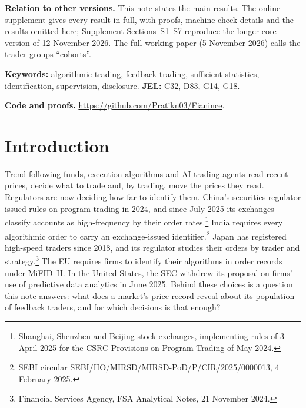 \begin{abstract}
\noindent Algorithmic traders read prices and, by trading, move them. Populations with the same feedback kernel produce identical prices, profits and equilibria; prices identify nothing finer, and learning composition costs data of order $(\Delta\eta)^{-(4K-2)}$, even near instability, so targeted supervision needs tagged flow. In a pre-registered out-of-sample test on Taiwan's tagged exchange flows (2019--2023), prices improve forecasts of foreign investors' flow as the registered criterion requires, but a pre-specified check attributes the gain to prices revealing past flow rather than to feedback. A registered test of the position-limit prediction on Binance perpetual futures is inconclusive. Core results are machine-checked in Lean~4.
\end{abstract}

\noindent\textbf{Relation to other versions.} This note states the main results. The online supplement gives every result in full, with proofs, machine-check details and the results omitted here; Supplement Sections~S1--S7 reproduce the longer core version of 12 November 2026. The full working paper (5 November 2026) calls the trader groups ``co\-horts''.

\noindent\textbf{Keywords:} algorithmic trading, feedback trading, sufficient statistics, identification, supervision, disclosure. \textbf{JEL:} C32, D83, G14, G18.

\noindent\textbf{Code and proofs.} \url{https://github.com/Pratikn03/Fianince}.

\endgroup
\newpage
\pagestyle{fancy}
\setcounter{page}{1}

\section{Introduction}\label{n:intro}

Trend-following funds, execution algorithms and AI trading agents read recent prices, decide what to trade and, by trading, move the prices they read. Regulators are now deciding how far to identify them. China's securities regulator issued rules on program trading in 2024, and since July 2025 its exchanges classify accounts as high-frequency by their order rates.\footnote{Shanghai, Shenzhen and Beijing stock exchanges, implementing rules of 3 April 2025 for the CSRC Provisions on Program Trading of May 2024.} India requires every algorithmic order to carry an exchange-issued identifier.\footnote{SEBI circular SEBI/HO/MIRSD/MIRSD-PoD/P/CIR/2025/0000013, 4 February 2025.} Japan has registered high-speed traders since 2018, and its regulator studies their orders by trader and strategy.\footnote{Financial Services Agency, FSA Analytical Notes, 21 November 2024.} The EU requires firms to identify their algorithms in order records under MiFID~II. In the United States, the SEC withdrew its proposal on firms' use of predictive data analytics in June 2025. Behind these choices is a question this note answers: what does a market's price record reveal about its population of feedback traders, and for which decisions is that enough?

